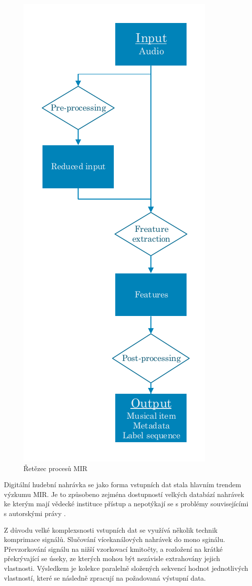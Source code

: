 \begin{figure}[H]
    \centering
    \includegraphics[width = 0.4\linewidth]{obrazky/MIR-diagram.pdf}
    \caption{Řetězec procesů MIR \cite{a_new_companion_to_digital_humanities}}
    \label{fig:MIR_diagram}
\end{figure}

    Digitální hudební nahrávka se jako forma vstupních dat stala hlavním trendem výzkumu \acs{MIR}.
    Je to způsobeno zejména dostupností velkých databází nahrávek ke kterým mají vědecké instituce přístup a nepotýkají se s problémy souvisejícími s autorskými právy \cite{a_new_companion_to_digital_humanities}.

    Z důvodu velké komplexsnosti vstupních dat se využívá několik technik komprimace signálů. 
    Slučování vícekanálových nahrávek do mono sginálu. Převzorkování signálu na nižší vzorkovací kmitočty,
    a rozložení na krátké překrývající se úseky, ze kterých mohou být nezávisle extrahovány jejich vlastnosti\cite{lidy09:448[TUW-181186]}. 
    Výsledkem je kolekce paralelně složených sekvencí hodnot jednotlivých vlastností, které se následně zpracují na požadovaná výstupní data.

